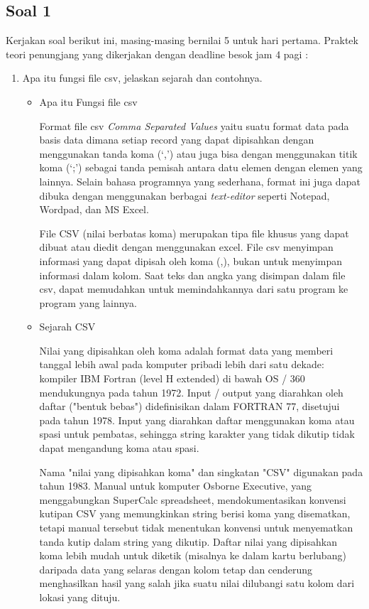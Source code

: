 \subsection{Soal 1}
Kerjakan soal berikut ini, masing-masing bernilai 5 untuk hari pertama. Praktek teori penungjang yang dikerjakan dengan deadline besok jam 4 pagi :
\begin{enumerate}
 \item Apa itu fungsi file csv, jelaskan sejarah dan contohnya.
   \begin{itemize}
    \item Apa itu Fungsi file csv

     Format file csv \textit{Comma Separated Values} yaitu suatu format data pada basis data dimana setiap record yang dapat dipisahkan dengan menggunakan tanda koma (`,’) atau juga bisa dengan menggunakan titik koma (`;’) sebagai tanda pemisah antara datu elemen dengan elemen yang lainnya. Selain bahasa programnya yang sederhana, format ini juga dapat dibuka dengan menggunakan berbagai \textit{text-editor} seperti Notepad, Wordpad, dan MS Excel.

     File CSV (nilai berbatas koma) merupakan tipa file khusus yang dapat dibuat atau diedit dengan menggunakan excel. File csv menyimpan informasi yang dapat dipisah oleh koma (,), bukan untuk menyimpan informasi dalam kolom. Saat teks dan angka yang disimpan dalam file csv, dapat memudahkan untuk memindahkannya dari satu program ke program yang lainnya.

    \item Sejarah CSV

     Nilai yang dipisahkan oleh koma adalah format data yang memberi tanggal lebih awal pada komputer pribadi lebih dari satu dekade: kompiler IBM Fortran (level H extended) di bawah OS / 360 mendukungnya pada tahun 1972. Input / output yang diarahkan oleh daftar ("bentuk bebas") didefinisikan dalam FORTRAN 77, disetujui pada tahun 1978. Input yang diarahkan daftar menggunakan koma atau spasi untuk pembatas, sehingga string karakter yang tidak dikutip tidak dapat mengandung koma atau spasi.

     Nama "nilai yang dipisahkan koma" dan singkatan "CSV" digunakan pada tahun 1983. Manual untuk komputer Osborne Executive, yang menggabungkan SuperCalc spreadsheet, mendokumentasikan konvensi kutipan CSV yang memungkinkan string berisi koma yang disematkan, tetapi manual tersebut tidak menentukan konvensi untuk menyematkan tanda kutip dalam string yang dikutip. Daftar nilai yang dipisahkan koma lebih mudah untuk diketik (misalnya ke dalam kartu berlubang) daripada data yang selaras dengan kolom tetap dan cenderung menghasilkan hasil yang salah jika suatu nilai dilubangi satu kolom dari lokasi yang dituju.


\end{itemize}
\end{enumerate}
